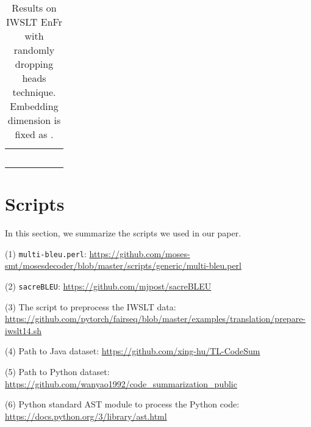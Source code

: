 \documentclass{article}
\begin{document}
\begin{table}[!htbp]
\centering
\caption{Results on IWSLT EnFr with randomly dropping heads technique. Embedding dimension  is fixed as .}
\begin{tabular}{lccccc}
\toprule
		 &   &  &  &  &  \\
\midrule
		 &  &  &  &	 &  \\
		 &  &  &  &	 &  \\
		 &  &  &  &	 &  \\
		 &  &  &  &	 &  \\
		 &  &  &  &	 &  \\
\bottomrule
\end{tabular}
\label{tab:iwslt_enfr_diff_dr_var}
\end{table}






\section{Scripts}
In this section, we summarize the scripts we used in our paper.

\noindent(1) \texttt{multi-bleu.perl}: \url{https://github.com/moses-smt/mosesdecoder/blob/master/scripts/generic/multi-bleu.perl}

\noindent(2) \texttt{sacreBLEU}: \url{https://github.com/mjpost/sacreBLEU}

\noindent(3) The script to preprocess the IWSLT data: \url{https://github.com/pytorch/fairseq/blob/master/examples/translation/prepare-iwslt14.sh}\label{foot:fb_script}

\noindent(4) Path to Java dataset: \url{https://github.com/xing-hu/TL-CodeSum}

\noindent(5) Path to Python dataset: \url{https://github.com/wanyao1992/code_summarization_public}

\noindent(6) Python standard AST module to process the Python code: \url{https://docs.python.org/3/library/ast.html}





\end{document}
